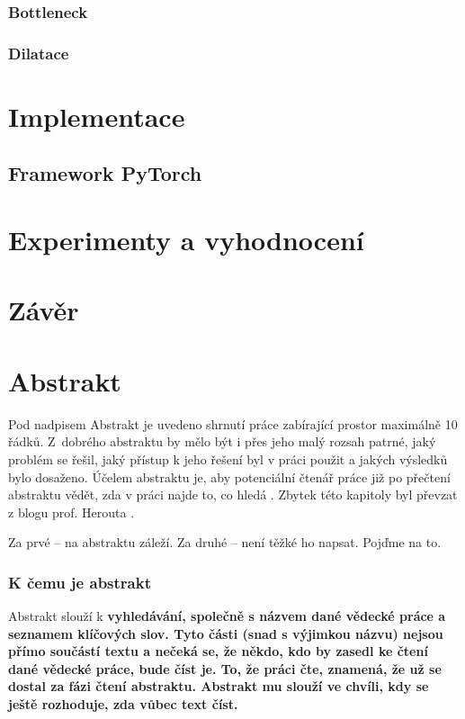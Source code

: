 \subsection{Bottleneck}
\subsection{Dilatace}


\chapter{Implementace}
\label{implementace}
\section{Framework PyTorch}


\chapter{Experimenty a vyhodnocení}
\label{experimenty}
\blindtext[4]
\blindtext[2]

\chapter{Závěr}
\label{zaver}
\blindtext[3]





\chapter{Abstrakt}
\label{abstrakt}
Pod nadpisem Abstrakt je uvedeno shrnutí práce zabírající prostor maximálně 10 řádků. Z~dobrého abstraktu by mělo být i přes jeho malý rozsah patrné, jaký problém se řešil, jaký přístup k jeho řešení byl v práci použit a jakých výsledků bylo dosaženo. Účelem abstraktu je, aby potenciální čtenář práce již po přečtení abstraktu vědět, zda v práci najde to, co hledá \cite{fitWeb}. Zbytek této kapitoly byl převzat z blogu prof. Herouta \cite{Herout}.
\bigskip

\noindent Za prvé – na abstraktu záleží. Za druhé – není těžké ho napsat. Pojďme na to.

\subsection*{K čemu je abstrakt}
Abstrakt slouží k \bf vyhledávání\rm, společně s názvem dané vědecké práce a seznamem klíčových slov. Tyto části (snad s výjimkou názvu) nejsou přímo součástí textu a nečeká se, že někdo, kdo by zasedl ke čtení dané vědecké práce, bude číst je. To, že práci čte, znamená, že už se dostal za fázi čtení abstraktu. Abstrakt mu slouží ve chvíli, kdy se ještě rozhoduje, \bf zda vůbec \rm text číst.

